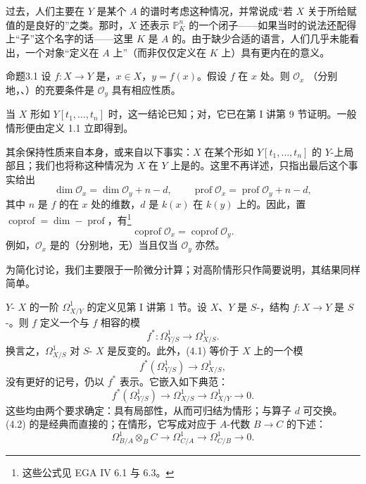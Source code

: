 过去，人们主要在 $Y$ 是某个 $A$ 的谱时考虑这种情况，并常说成“若 $X$ 关于所给赋值的是良好的”之类。那时，$X$ 还表示 $\mathbb P^n_K$ 的一个闭子——如果当时的说法还配得上“子”这个名字的话——这里 $K$ 是 $A$ 的。由于缺少合适的语言，人们几乎未能看出，一个对象“定义在 $A$ 上”（而非仅仅定义在 $K$ 上）具有更内在的意义。

\begin{SGAresult}{命题}{3.1}
设 $f:X\to Y$ 是，$x\in X$，$y=f(x)$。假设 $f$ 在 $x$ 处。则 $\mathcal O_x$ （分别地，、）的充要条件是 $\mathcal O_y$ 具有相应性质。
\end{SGAresult}

当 $X$ 形如 $Y[t_1,\ldots,t_n]$ 时，这一结论已知；对，它已在第 I 讲第 9 节证明。一般情形便由定义 1.1 立即得到。

其余保持性质来自本身，或来自以下事实：$X$ 在某个形如 $Y[t_1,\ldots,t_n]$ 的 $Y$-上局部且；我们也将称这种情况为 $X$ 在 $Y$ 上是的。这里不再详述，只指出最后这个事实给出
\[
\dim\mathcal O_x=\dim\mathcal O_y+n-d,\qquad
\operatorname{prof}\mathcal O_x=\operatorname{prof}\mathcal O_y+n-d,\tag{3.1}
\]
其中 $n$ 是 $f$ 的在 $x$ 处的维数，$d$ 是 $k(x)$ 在 $k(y)$ 上的。因此，置 $\operatorname{coprof}=\dim-\operatorname{prof}$，有\footnote{这些公式见 EGA IV 6.1 与 6.3。}
\[
\operatorname{coprof}\mathcal O_x=\operatorname{coprof}\mathcal O_y.\tag{3.2}
\]
例如，$\mathcal O_x$ 是的（分别地，无）当且仅当 $\mathcal O_y$ 亦然。

为简化讨论，我们主要限于一阶微分计算；对高阶情形只作简要说明，其结果同样简单。

$Y$- $X$ 的一阶 $\Omega^1_{X/Y}$ 的定义见第 I 讲第 1 节。设 $X$、$Y$ 是 $S$-，结构 $f:X\to Y$ 是 $S$-。则 $f$ 定义一个与 $f$ 相容的模
\[
f^*:\Omega^1_{Y/S}\longrightarrow\Omega^1_{X/S}.\tag{4.1}
\]
换言之，$\Omega^1_{X/S}$ 对 $S$- $X$ 是反变的。此外，(4.1) 等价于 $X$ 上的一个模
\[
f^*(\Omega^1_{Y/S})\longrightarrow\Omega^1_{X/S},\tag{4.1bis}
\]
没有更好的记号，仍以 $f^*$ 表示。它嵌入如下典范：
\[
f^*(\Omega^1_{Y/S})\longrightarrow\Omega^1_{X/S}
\longrightarrow\Omega^1_{X/Y}\longrightarrow0.\tag{4.2}
\]
这些均由两个要求确定：具有局部性，从而可归结为情形；与算子 $d$ 可交换。(4.2) 的是经典而直接的；在情形，它写成对应于 $A$-代数 $B\to C$ 的下述：
\[
\Omega^1_{B/A}\otimes_B C\longrightarrow\Omega^1_{C/A}
\longrightarrow\Omega^1_{C/B}\longrightarrow0.\tag{4.2bis}
\]

